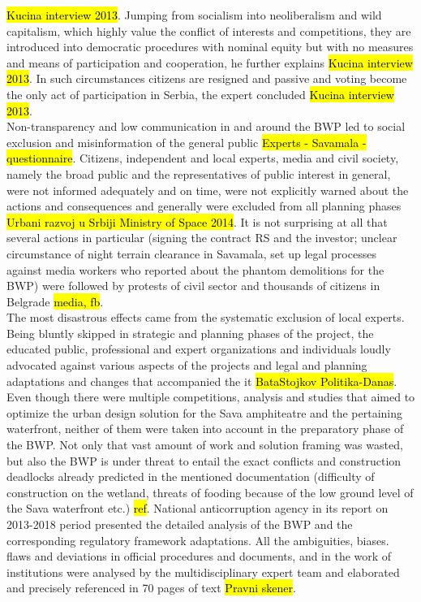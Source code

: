 \documentclass[11pt]{report}
\begin{document}
\hl{Kucina interview 2013}.
Jumping from socialism into neoliberalism and wild capitalism, which highly value the conflict of interests and competitions, they are introduced into democratic procedures with nominal equity but with no measures and means of participation and cooperation, he further explains \hl{Kucina interview 2013}.
In such circumstances citizens are resigned and passive and voting become the only act of participation in Serbia, the expert concluded \hl{Kucina interview 2013}.
\\
Non-transparency and low communication in and around the BWP led to social exclusion and misinformation of the general public \hl{Experts - Savamala - questionnaire}.
Citizens, independent and local experts, media and civil society, namely the broad public and the representatives of public interest in general, were not informed adequately and on time, were not explicitly warned about the actions and consequences and generally were excluded from all planning phases \hl{Urbani razvoj u Srbiji Ministry of Space 2014}.
It is not surprising at all that several actions in particular (signing the contract RS and the investor; unclear circumstance of night terrain clearance in Savamala, set up legal processes against media workers who reported about the phantom demolitions for the BWP) were followed by protests of civil sector and thousands of citizens in Belgrade \hl{media, fb}.
\\
The most disastrous effects came from the systematic exclusion of local experts.
Being bluntly skipped in strategic and planning phases of the project, the educated public, professional and expert organizations and individuals loudly advocated against various aspects of the projects and legal and planning adaptations and changes that accompanied the it 
\hl{BataStojkov Politika-Danas}.
Even though there were multiple competitions, analysis and studies that aimed to optimize the urban design solution for the Sava amphiteatre and the pertaining waterfront, neither of them were taken into account in the preparatory phase of the BWP. %
Not only that vast amount of work and solution framing was wasted, but also the BWP is under threat to entail the exact conflicts and construction deadlocks already predicted in the mentioned documentation (difficulty of construction on the wetland, threats of fooding because of the low ground level of the Sava waterfront etc.) \hl{ref}.
National anticorruption agency in its report on 2013-2018 period presented the detailed analysis of the BWP and the corresponding regulatory framework adaptations. All the ambiguities, biases. flaws and deviations in official procedures and documents, and in the work of institutions were analysed by the multidisciplinary expert team and elaborated and precisely referenced in 70 pages of text \hl{Pravni skener}.
\end{document}
